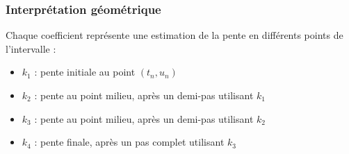     
    \subsubsection{Interprétation géométrique}
    Chaque coefficient représente une estimation de la pente en différents points de l'intervalle :
    \begin{itemize}
        \item $k_1$ : pente initiale au point $(t_n, u_n)$
        \item $k_2$ : pente au point milieu, après un demi-pas utilisant $k_1$
        \item $k_3$ : pente au point milieu, après un demi-pas utilisant $k_2$
        \item $k_4$ : pente finale, après un pas complet utilisant $k_3$
    \end{itemize}
    
            
            
            
            
            
